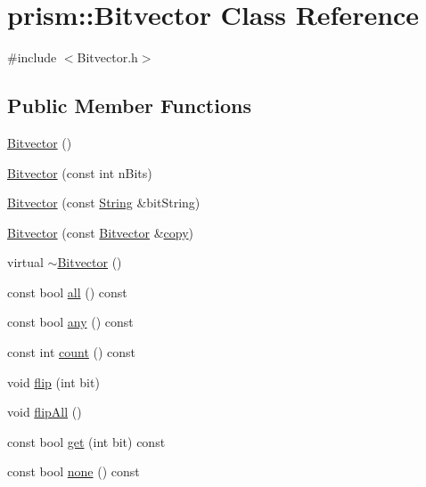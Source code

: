 \hypertarget{classprism_1_1_bitvector}{}\section{prism\+:\+:Bitvector Class Reference}
\label{classprism_1_1_bitvector}


{\ttfamily \#include $<$Bitvector.\+h$>$}

\subsection*{Public Member Functions}
\begin{DoxyCompactItemize}
\item 
\hyperlink{classprism_1_1_bitvector_a41d5de4bbd7bf193121a1614cf6b3b3b}{Bitvector} ()
\item 
\hyperlink{classprism_1_1_bitvector_ae2c403debb39b93d7de3317deb0daeeb}{Bitvector} (const int n\+Bits)
\item 
\hyperlink{classprism_1_1_bitvector_aaf4223cb87ea463a8f329a5599644314}{Bitvector} (const \hyperlink{classprism_1_1_string}{String} \&bit\+String)
\item 
\hyperlink{classprism_1_1_bitvector_a9b0b8f78113cbce3082f2c67fb702a6c}{Bitvector} (const \hyperlink{classprism_1_1_bitvector}{Bitvector} \&\hyperlink{namespaceprism_ae776f4cd825f79e7af1cf6ee1d90a209}{copy})
\item 
virtual \hyperlink{classprism_1_1_bitvector_ac68d7732ae33ccded5b5ef5971280c6d}{$\sim$\+Bitvector} ()
\item 
const bool \hyperlink{classprism_1_1_bitvector_ae67b760618f6bf396afb68352a5dfcad}{all} () const 
\item 
const bool \hyperlink{classprism_1_1_bitvector_ad055160febd837c0c7b5586821c383f0}{any} () const 
\item 
const int \hyperlink{classprism_1_1_bitvector_a62458e0b7d104c8897124ba7e858b34c}{count} () const 
\item 
void \hyperlink{classprism_1_1_bitvector_aaa5007377d0c3ff1340967e6fa2b81a1}{flip} (int bit)
\item 
void \hyperlink{classprism_1_1_bitvector_a9133aaa30ecd6393a96932e5721c6a2d}{flip\+All} ()
\item 
const bool \hyperlink{classprism_1_1_bitvector_a0a3d203905a1125a2afbdd928997dbe2}{get} (int bit) const 
\item 
const bool \hyperlink{classprism_1_1_bitvector_a33d1e72acbab4fb32eb24ddf72adc0cd}{none} () const 

\end{DoxyCompactItemize}
